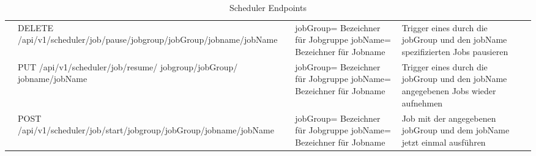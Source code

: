 \begin{table}[H]
\begin{tabular}{|p{}|p{}|p{}|p{}|l}
                  & DELETE \newline /api/v1/scheduler/job/pause/\newline jobgroup/{jobGroup}/\newline jobname/{jobName} & jobGroup= Bezeichner für Jobgruppe \newline jobName= Bezeichner für Jobname & Trigger eines durch die jobGroup und den jobName spezifizierten Jobs pausieren  &  \\ \cline{2-4}
                  & PUT \newline /api/v1/scheduler/job/\newline resume/ jobgroup/{jobGroup}/ \newline jobname/{jobName} & jobGroup= Bezeichner für Jobgruppe \newline jobName= Bezeichner für Jobname & Trigger eines durch die jobGroup und den jobName angegebenen Jobs wieder aufnehmen  &  \\ \cline{2-4}
                  & POST \newline /api/v1/scheduler/job/start/\newline jobgroup/{jobGroup}/\newline jobname/{jobName}  & jobGroup= Bezeichner für Jobgruppe \newline jobName= Bezeichner für Jobname & Job mit der angegebenen jobGroup und dem jobName jetzt einmal ausführen &  \\ \cline{1-4}
\end{tabular}
\caption{Scheduler Endpoints}
\label{tab:endpointsScheduler}
\end{table}


